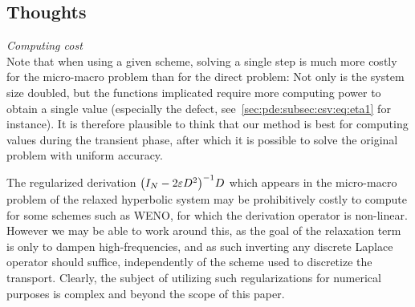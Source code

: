 \subsection{Thoughts} 
\label{sec:tests:subsec:thoughts}

\hspace*{1em}

\noindent\textit{Computing cost}\\
%
Note that when using a given scheme, solving a single step is much more
costly for the micro-macro problem than for the direct problem: Not only
is the system size doubled, but the functions implicated require more
computing power to obtain a single value (especially the defect,
see~\eqref{sec:pde:subsec:csv:eq:eta1} for instance). It is therefore 
plausible to think that our method is best for computing values during the
transient phase, after which it is possible to solve the original problem 
with uniform accuracy. 

The regularized derivation $\big( I_N - 2\varepsilon D^2 \big)^{-1} D$ which
appears in the micro-macro problem of the relaxed hyperbolic system may be
prohibitively costly to compute for some schemes such as WENO, for which
the derivation operator is non-linear. However we may be able to work
around this, as the goal of the relaxation term is only to dampen
high-frequencies, and as such inverting any discrete Laplace operator
should suffice, independently of the scheme used to discretize the
transport. Clearly, the subject of utilizing such regularizations for
numerical purposes is complex and beyond the scope of this paper.


